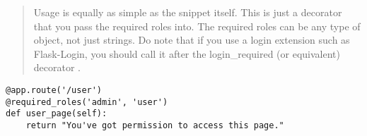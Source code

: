 \documentclass[../main/main.tex]{subfiles}
\begin{document}
\begin{quote}
Usage is equally as simple as the snippet itself. This is just a decorator that
you pass the required roles into. The required roles can be any type of object,
not just strings. Do note that if you use a login extension such as Flask-Login,
you should call it after the login_required (or equivalent) decorator
\cite{flask:auth}.
\end{quote}

\begin{lstlisting}
@app.route('/user')
@required_roles('admin', 'user')
def user_page(self):
    return "You've got permission to access this page."
\end{lstlisting}


% 
\end{document}
